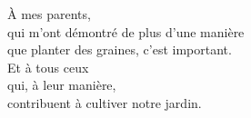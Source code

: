 \documentclass[../thesis.tex]{subfiles}
\begin{document}
\thispagestyle{empty}
{}

\null %

\vfill

\begin{otherlanguage}{french}
  \begin{center}
    À mes parents, \\
    qui m'ont démontré de plus d'une manière \\
    que planter des graines, c'est important. \\
    \bigskip
    Et à tous ceux \\
    qui, à leur manière, \\
    contribuent à cultiver notre jardin.
  \end{center}

\end{otherlanguage}

\vfill
\end{document}
